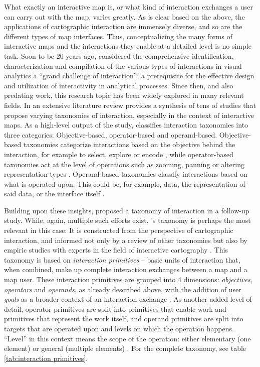 What exactly an interactive map is,
or what kind of interaction exchanges a user can carry out with the map,
varies greatly.  %
As is clear based on the above,
the applications of cartographic interaction are immensely diverse,
and so are the different types of map interfaces.
Thus, conceptualizing the many forms of
interactive maps and the interactions they enable
at a detailed level is no simple task.
Soon to be 20 years ago,
\textcite{tho2005} considered the comprehensive
identification, characterization and compilation
of the various types of interactions in visual analytics a
\enquote{grand challenge of interaction}:
a prerequisite for the effective design and utilization of
interactivity in analytical processes.
Since then, and also predating  work,
this research topic has been widely explored in many relevant fields.
In an extensive literature review \textcite{rot2012}
provides a synthesis of tens of studies
that propose varying taxonomies of interaction,
especially in the context of interactive maps.
As a high-level output of the study, \citeauthor{rot2012}
classifies interaction taxonomies into three categories:
Objective-based, operator-based and operand-based.
Objective-based taxonomies categorize interactions based on
the objective behind the interaction,
for example to select, explore or encode \parencite{yi2007},
while operator-based taxonomies act at the level of operations such as
zooming, panning or altering representation types \parencite{eds2008}.
Operand-based taxonomies classify interactions based on what is operated upon.
This could be, for example, data, the representation of said data,
or the interface itself \parencite{cra2002}.

Building upon these insights,
\textcite{rot2013a} proposed a taxonomy of interaction in a follow-up study.
While, again, multiple such efforts exist,
\citeauthor{rot2013a}'s taxonomy is perhaps the most relevant in this case:
It is constructed from the perspective of cartographic interaction,
and informed not only by a review of other taxonomies \parencite{rot2012}
but also by empiric studies with experts in the field of interactive cartography
\parencite{rot2013a}.
This taxonomy is based on \textit{interaction primitives} --
basic units of interaction that, when combined,
make up complete interaction exchanges between a map and a map user.
These interaction primitives are grouped into 4 dimensions:
\textit{objectives}, \textit{operators} and \textit{operands}, as already described above,
with the addition of user \textit{goals} as a broader context of
an interaction exchange \parencite{rot2013a}.
As another added level of detail, operator primitives are split into primitives that
enable work and primitives that represent the work itself,
and operand primitives are split into targets that are operated
upon and levels on which the operation happens.
\enquote{Level} in this context means the scope of the operation:
either elementary (one element) or general (multiple elements) \parencite{rot2013a}.
For the complete taxonomy, see table \ref{tab:interaction primitives}.

